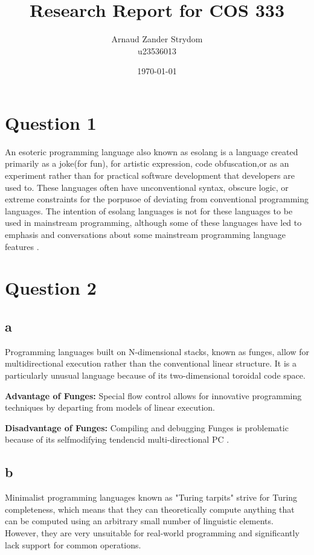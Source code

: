 \documentclass{article}  %
\title{Research Report for COS 333}
\author{Arnaud Zander Strydom \\ u23536013}
\date{\today}
\begin{document}
\maketitle

\section{Question 1}
An esoteric programming language also known as esolang is a language created primarily as a joke(for fun), for artistic expression, code obfuscation,or as an experiment rather than for practical software development that developers are used to. These languages often have unconventional syntax, obscure logic, or extreme constraints for the porpusoe of deviating from conventional programming languages. The intention of esolang languages is not for these languages to be used in mainstream programming, although some of these languages have led to emphasis and conversations about some mainstream programming language features \cite{esolang2025}.

\section{Question 2}

\subsection{a}
Programming languages built on N-dimensional stacks, known as funges, allow for multidirectional execution rather than the conventional linear structure. It is a particularly unusual language because of its two-dimensional toroidal code space.

\textbf{Advantage of Funges:}  
Special flow control allows for innovative programming techniques by departing from models of linear execution.

\textbf{Disadvantage of Funges:}  
Compiling and debugging Funges is problematic because of its selfmodifying tendencid multi-directional PC \cite{Funge93}. 

\subsection{b}
Minimalist programming languages known as "Turing tarpits" strive for Turing completeness, which means that they can theoretically compute anything that can be computed using an arbitrary small number of linguistic elements. However, they are very unsuitable for real-world programming and significantly lack support for common operations.
\end{document}
